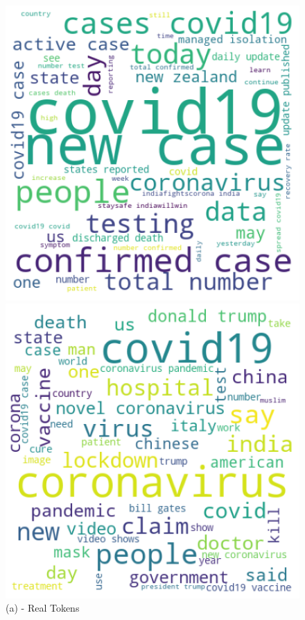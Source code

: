 \documentclass{article}
\begin{document}
\begin{figure}[H]
  \includegraphics[width=\linewidth]{real_tokens.png}
  \caption*{(a) - Real Tokens}\label{fig:real_tokens}
\endminipage\hfill
{}
  \includegraphics[width=\linewidth]{fake_tokens.png}

\end{figure}
\end{document}
